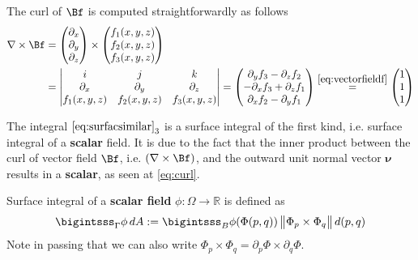 \documentclass[12pt]{article}
\begin{document}
\begin{enumerate}[(i)]
	      The curl of $\Bf$ is computed straightforwardly as follows
	      \begin{align}
		      \label{eq:curl}
		      \nabla \times \Bf 
		       & =
		      \begin{pmatrix}
			      \partial_x \\ \partial_y \\ \partial_z
		      \end{pmatrix}
		      \times
		      \begin{pmatrix}
			      f_{1}(x,y,z) \\ f_{2}(x,y,z) \\ f_{3}(x,y,z)
		      \end{pmatrix} \notag \\
		       & = 
		      \begin{vmatrix}
			      i            & j            & k            \\
			      \partial_x   & \partial_y   & \partial_z   \\
			      f_{1}(x,y,z) & f_{2}(x,y,z) & f_{3}(x,y,z)
		      \end{vmatrix}
		      =
		      \begin{pmatrix}
			      \partial_yf_3 - \partial_zf_2   \\
			      - \partial_xf_3 + \partial_zf_1 \\
			      \partial_xf_2 - \partial_yf_1 
		      \end{pmatrix}
		      \stackrel{\eqref{eq:vectorfieldf}}{=}
		      \begin{pmatrix}
			      1 \\1\\1
		      \end{pmatrix}
	      \end{align}
	      
	      \begin{observationboxed}
		      The integral $\eqref{eq:surfacsimilar}_{3}$
		      is a surface integral of the first kind, i.e.
		      surface integral of a \textbf{scalar} field.
		      It is due to the fact that 
		      the inner product between the curl of vector field $\Bf$, i.e. $(\nabla \times \Bf)$,
		      and the outward unit normal vector $\bm{\nu}$
		      results in a \textbf{scalar}, as seen at \eqref{eq:curl}.
	      \end{observationboxed}
	      \begin{recallboxed}
		      Surface integral of a 
		      \textbf{scalar field} $\phi: \Omega \to \mathbb{R}$ is defined as
		      \begin{align}
			      \label{recall:scalarsurface}
			      \bigintsss_{\Gamma} \phi \, dA 
			      := \bigintsss_{B} \phi(\Phi(p,q)) \, \big\| \Phi_p \times \Phi_q \big\| \, d(p,q)
		      \end{align}
		      Note in passing that we can also write $\Phi_p \times \Phi_q = \partial_{p}\Phi \times \partial_{q}\Phi$.
	      \end{recallboxed}
	      

\end{enumerate}
\end{document}
